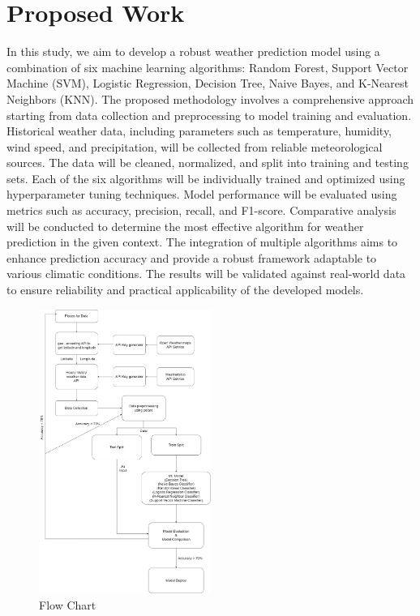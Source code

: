 \documentclass[conference]{IEEEtran}
\begin{document}
\section{\textbf{Proposed Work}}
In this study, we aim to develop a robust weather prediction model using a combination of six machine learning algorithms: Random Forest, Support Vector Machine (SVM), Logistic Regression, Decision Tree, Naive Bayes, and K-Nearest Neighbors (KNN). The proposed methodology involves a comprehensive approach starting from data collection and preprocessing to model training and evaluation. Historical weather data, including parameters such as temperature, humidity, wind speed, and precipitation, will be collected from reliable meteorological sources. The data will be cleaned, normalized, and split into training and testing sets. Each of the six algorithms will be individually trained and optimized using hyperparameter tuning techniques. Model performance will be evaluated using metrics such as accuracy, precision, recall, and F1-score. Comparative analysis will be conducted to determine the most effective algorithm for weather prediction in the given context. The integration of multiple algorithms aims to enhance prediction accuracy and provide a robust framework adaptable to various climatic conditions. The results will be validated against real-world data to ensure reliability and practical applicability of the developed models.

\begin{figure}[htbp] %
    \centering
    \includegraphics[width=0.5\textwidth]{"../../images/flow_chart.png"} %
    \caption{Flow Chart}
    \label{Flow Chart}
\end{figure}
\end{document}
